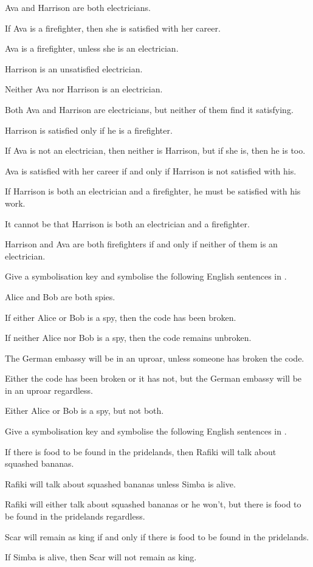 \begin{earg}
\item Ava and Harrison are both electricians.
\item If Ava is a firefighter, then she is satisfied with her career.
\item Ava is a firefighter, unless she is an electrician.
\item Harrison is an unsatisfied electrician.
\item Neither Ava nor Harrison is an electrician.
\item Both Ava and Harrison are electricians, but neither of them find it satisfying.
\item Harrison is satisfied only if he is a firefighter.
\item If Ava is not an electrician, then neither is Harrison, but if she is, then he is too.
\item Ava is satisfied with her career if and only if Harrison is not satisfied with his.
\item If Harrison is both an electrician and a firefighter, he must be satisfied with his work.
\item It cannot be that Harrison is both an electrician and a firefighter.
\item Harrison and Ava are both firefighters if and only if neither of them is an electrician.
\end{earg}

\solutions
\problempart
\label{pr.spies}
Give a symbolisation key and symbolise the following English sentences in \TFL.
\begin{earg}
\item Alice and Bob are both spies.
\item If either Alice or Bob is a spy, then the code has been broken.
\item If neither Alice nor Bob is a spy, then the code remains unbroken.
\item The German embassy will be in an uproar, unless someone has broken the code.
\item Either the code has been broken or it has not, but the German embassy will be in an uproar regardless.
\item Either Alice or Bob is a spy, but not both.
\end{earg}

\solutions
\problempart Give a symbolisation key and symbolise the following English sentences in \TFL.
\begin{earg}
\item If there is food to be found in the pridelands, then Rafiki will talk about squashed bananas.
\item Rafiki will talk about squashed bananas unless Simba is alive.
\item Rafiki will either talk about squashed bananas or he won't, but there is food to be found in the pridelands regardless.
\item Scar will remain as king if and only if there is food to be found in the pridelands.
\item If Simba is alive, then Scar will not remain as king.
\end{earg}

